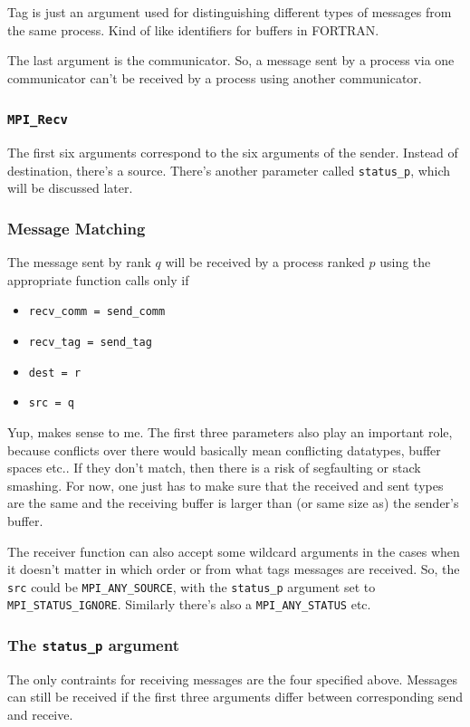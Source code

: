 \documentclass[a4paper]{article}
\begin{document}
Tag is just an argument used for distinguishing different types of
messages from the same process. Kind of like identifiers for buffers
in FORTRAN.

The last argument is the communicator. So, a message sent by a
process via one communicator can't be received by a process using
another communicator.

\subsubsection{\texttt{MPI\_Recv}}
The first six arguments correspond to the six arguments of the sender.
Instead of destination, there's a source. There's another parameter
called \texttt{status\_p}, which will be discussed later.

\subsubsection{Message Matching}
The message sent by rank $q$ will be received by a process ranked $p$
using the appropriate function calls only if
\begin{itemize}
	\item \texttt{recv\_comm = send\_comm}
	\item \texttt{recv\_tag = send\_tag}
	\item \texttt{dest = r}
	\item \texttt{src = q}
\end{itemize}

Yup, makes sense to me. The first three parameters also play an important
role, because conflicts over there  would basically mean conflicting
datatypes, buffer spaces etc.. If they don't match, then there is a risk
of segfaulting or stack smashing. For now, one just has to make sure
that the received and sent types are the same and the receiving buffer
is larger than (or same size as) the sender's buffer.

The receiver function can also accept some wildcard arguments in the
cases when it doesn't matter in which order or from what tags messages
are received. So, the \texttt{src} could be \texttt{MPI\_ANY\_SOURCE},
with the \texttt{status\_p} argument set to \texttt{MPI\_STATUS\_IGNORE}. Similarly there's also a \texttt{MPI\_ANY\_STATUS} etc.

\subsubsection*{The  \texttt{status\_p} argument }
The only contraints for receiving messages are the four specified
above. Messages can still be received if the first three arguments 
differ between corresponding send and receive. 
\end{document}
